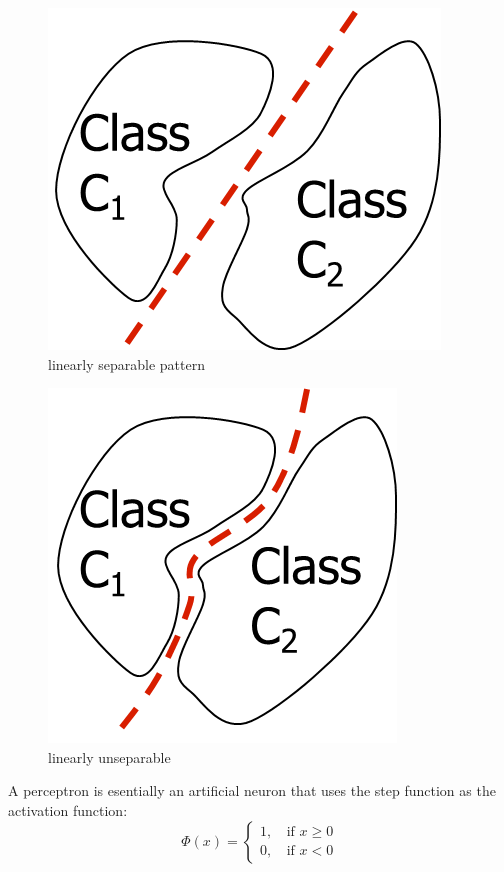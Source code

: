 \documentclass[a4paper,12pt,answers]{article}
\begin{document}
	\begin{multicols}{2}
		\begin{figure}[H]
			\centering
			\includegraphics[width=0.7\linewidth]{images/linear_sep}
			\caption{linearly separable pattern}
			\label{fig:linearsep}
		\end{figure}
		\begin{figure}[H]
			\centering
			\includegraphics[width=0.7\linewidth]{images/linear_unsep}
			\caption{linearly unseparable}
			\label{fig:linearunsep}
		\end{figure}
		
	\end{multicols}
	\noindent
	A perceptron is esentially an artificial neuron that uses the step function as the activation function:
	\[
	\Phi(x) =
	\begin{cases}
		1, \, &\text{if } x \ge 0 \\
		0, \, &\text{if } x < 0
	\end{cases}
	\]
	
\end{document}

